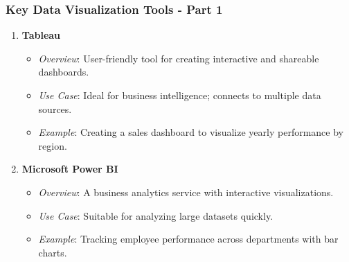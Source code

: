 \documentclass[aspectratio=169]{beamer}
\begin{document}
\begin{frame}[fragile]
    \frametitle{Key Data Visualization Tools - Part 1}
    \begin{enumerate}
        \item \textbf{Tableau}
        \begin{itemize}
            \item \textit{Overview}: User-friendly tool for creating interactive and shareable dashboards.
            \item \textit{Use Case}: Ideal for business intelligence; connects to multiple data sources.
            \item \textit{Example}: Creating a sales dashboard to visualize yearly performance by region.
        \end{itemize}

        \item \textbf{Microsoft Power BI}
        \begin{itemize}
            \item \textit{Overview}: A business analytics service with interactive visualizations.
            \item \textit{Use Case}: Suitable for analyzing large datasets quickly.
            \item \textit{Example}: Tracking employee performance across departments with bar charts.
        \end{itemize}
    \end{enumerate}
\end{frame}
\end{document}
